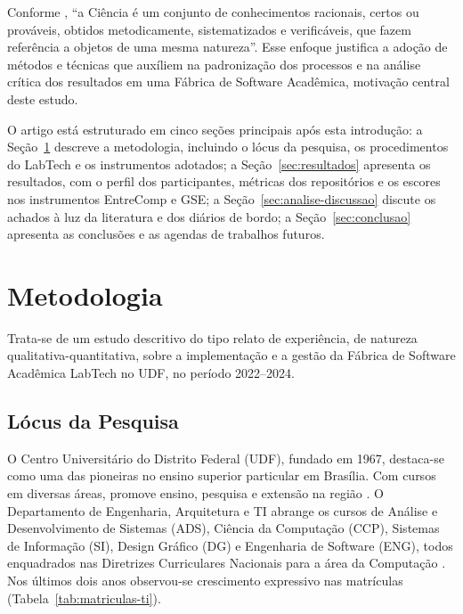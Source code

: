 \documentclass[12pt,a4paper]{article}
\begin{document}
Conforme , ``a Ci\^encia \'e um conjunto
de conhecimentos racionais, certos ou prov\'aveis, obtidos metodicamente,
sistematizados e verific\'aveis, que fazem refer\^encia a objetos de uma
mesma natureza''. Esse enfoque justifica a ado\c{c}\~ao de m\'etodos e
t\'ecnicas que aux\'iliem na padroniza\c{c}\~ao dos processos e na an\'alise
cr\'itica dos resultados em uma F\'abrica de Software Acad\^emica,
motiva\c{c}\~ao central deste estudo.

O artigo est\'a estruturado em cinco se\c{c}\~oes principais ap\'os esta
introdu\c{c}\~ao: a Se\c{c}\~ao~\ref{sec:metodologia} descreve a metodologia,
incluindo o l\'ocus da pesquisa, os procedimentos do LabTech e os
instrumentos adotados; a Se\c{c}\~ao~\ref{sec:resultados} apresenta os
resultados, com o perfil dos participantes, m\'etricas dos reposit\'orios
e os escores nos instrumentos EntreComp e GSE; a
Se\c{c}\~ao~\ref{sec:analise-discussao} discute os achados \`a luz da
literatura e dos di\'arios de bordo; a Se\c{c}\~ao~\ref{sec:conclusao}
apresenta as conclus\~oes e as agendas de trabalhos futuros.

\section{Metodologia}
\label{sec:metodologia}

Trata-se de um estudo descritivo do tipo relato de experi\^encia, de
natureza qualitativa-quantitativa, sobre a implementa\c{c}\~ao e a
gest\~ao da F\'abrica de Software Acad\^emica LabTech no UDF, no per\'iodo
2022--2024.

\subsection{L\'ocus da Pesquisa}
\label{sec:locus}

O Centro Universit\'ario do Distrito Federal (UDF), fundado em 1967,
destaca-se como uma das pioneiras no ensino superior particular em
Bras\'ilia. Com cursos em diversas \'areas, promove ensino, pesquisa e
extens\~ao na regi\~ao \cite{udfppc2023}. O Departamento de Engenharia,
Arquitetura e TI abrange os cursos de An\'alise e Desenvolvimento de
Sistemas (ADS), Ci\^encia da Computa\c{c}\~ao (CCP), Sistemas de
Informa\c{c}\~ao (SI), Design Gr\'afico (DG) e Engenharia de Software
(ENG), todos enquadrados nas Diretrizes Curriculares Nacionais para a
\'area da Computa\c{c}\~ao \cite{dcncomputacao2016}.
Nos \'ultimos dois anos observou-se crescimento expressivo nas
matr\'iculas (Tabela~\ref{tab:matriculas-ti}).
\end{document}
